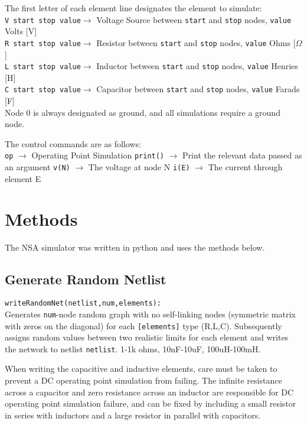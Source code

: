 The first letter of each element line designates the element to simulate: \\
\texttt{V start stop value}$\rightarrow$ Voltage Source between \texttt{start} and \texttt{stop} nodes, \texttt{value} Volts [V]\\
\texttt{R start stop value}$\rightarrow$ Resistor between \texttt{start} and \texttt{stop} nodes, \texttt{value} Ohms [$\Omega$]\\
\texttt{L start stop value}$\rightarrow$ Inductor between \texttt{start} and \texttt{stop} nodes, \texttt{value} Henries [H]\\
\texttt{C start stop value}$\rightarrow$ Capacitor between \texttt{start} and \texttt{stop} nodes, \texttt{value} Farads [F]\\

Node 0 is always designated as ground, and all simulations require a ground node.

The control commands are as follows:\\
\texttt{op} $\rightarrow$ Operating Point Simulation
\texttt{print()} $\rightarrow$ Print the relevant data passed as an argument
\texttt{v(N)} $\rightarrow$ The voltage at node N
\texttt{i(E)} $\rightarrow$ The current through element E

\section{Methods}
The NSA simulator was written in python and uses the methods below.

\subsection{Generate Random Netlist}
\texttt{writeRandomNet(netlist,num,elements):}\\
Generates \texttt{num}-node random graph with no self-linking nodes (symmetric matrix with zeros on the diagonal) for each \texttt{[elements]} type (R,L,C).
Subsequently assigns random values between two realistic limits for each element and writes the network to netlist \texttt{netlist}.
1-1k ohms, 10nF-10uF, 100uH-100mH.

When writing the capacitive and inductive elements, care must be taken to prevent a DC operating point simulation from failing.
The infinite resistance across a capacitor and zero resistance across an inductor are responsible for DC operating point simulation failure, and can be fixed by including a small resistor in series with inductors and a large resistor in parallel with capacitors. 

